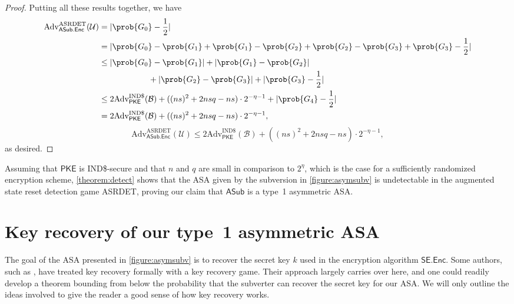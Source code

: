 \begin{proof}
Putting all these results together, we have
\iffullversion
\begin{align*}
\text{Adv}^\text{ASRDET}_\mathsf{ASub.Enc}(\mathcal{U})
&= |\prob{G_0}-\frac{1}{2}| \\
&= |\prob{G_0}-\prob{G_1}+\prob{G_1}-\prob{G_2}+\prob{G_2}-\prob{G_3}+\prob{G_3}-\frac{1}{2}| \\
&\le |\prob{G_0}-\prob{G_1}|+|\prob{G_1}-\prob{G_2}|\\
&\qquad\qquad\qquad +|\prob{G_2}-\prob{G_3}|+|\prob{G_3}-\frac{1}{2}| \\
&\le 2\text{Adv}^{\text{IND\$}}_\mathsf{PKE}(\mathcal{B}) + ((ns)^2+2nsq-ns)\cdot 2^{-\eta-1} + |\prob{G_4}-\frac{1}{2}|\\
&= 2\text{Adv}^{\text{IND\$}}_\mathsf{PKE}(\mathcal{B}) + ((ns)^2+2nsq-ns)\cdot 2^{-\eta-1},
\end{align*}
\else
\[
\text{Adv}^\text{ASRDET}_\mathsf{ASub.Enc}(\mathcal{U})\le 2\text{Adv}^{\text{IND\$}}_\mathsf{PKE}(\mathcal{B}) + ((ns)^2+2nsq-ns)\cdot 2^{-\eta-1},
\]
\fi
as desired.
\end{proof}

Assuming that $\mathsf{PKE}$ is IND\$-secure and that $n$ and $q$ are small in comparison to $2^{\eta}$, which is the case for a sufficiently randomized encryption scheme, \autoref{theorem:detect} shows that the ASA given by the subversion in \autoref{figure:asymsubv} is undetectable in the augmented state reset detection game ASRDET, proving our claim that $\mathsf{ASub}$ is a type~1 asymmetric ASA.


\section{Key recovery of our type~1 asymmetric ASA} \label{sec:keyrec1}
The goal of the ASA presented in \autoref{figure:asymsubv} is to recover the secret key $k$ used in the encryption algorithm $\mathsf{SE.Enc}$. Some authors, such as \cite{CCS:BelJaeKan15}, have treated key recovery formally with a key recovery game. Their approach largely carries over here, and one could readily develop a theorem bounding from below the probability that the subverter can recover the secret key for our ASA. We will only outline the ideas involved to give the reader a good sense of how key recovery works.

